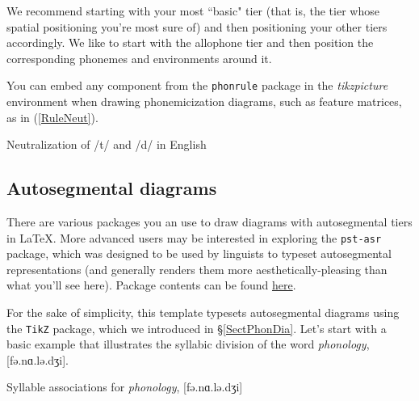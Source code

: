 \documentclass{article}
\begin{document}
\noindent We recommend starting with your most ``basic" tier (that is, the tier whose spatial positioning you're most sure of) and then positioning your other tiers accordingly. We like to start with the allophone tier and then position the corresponding phonemes and environments around it.  


You can embed any component from the \texttt{phonrule} package in the \textit{tikzpicture} environment when drawing phonemicization diagrams, such as feature matrices, as in (\ref{RuleNeut}).

\ea Neutralization of /t/ and /d/ in English \label{RuleNeut}

\z

\subsection{Autosegmental diagrams}\label{autoseg}
There are various packages you an use to draw diagrams with autosegmental tiers in \LaTeX{}. More advanced users may be interested in exploring the \texttt{pst-asr} package, which was designed to be used by linguists to typeset autosegmental representations (and generally renders them more aesthetically-pleasing than what you'll see here). Package contents can be found \href{https://ctan.org/tex-archive/graphics/pstricks/contrib/pst-asr/}{here}. 

For the sake of simplicity, this template typesets autosegmental diagrams using the \texttt{TikZ} package, which we introduced in \S\ref{SectPhonDia}. Let's start with a basic example that illustrates the syllabic division of the word \textit{phonology}, [fə.nɑ.lə.dʒi].

\ea Syllable associations for \textit{phonology}, [fə.nɑ.lə.dʒi]
\end{document}
